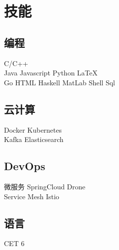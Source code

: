 \documentclass[]{deedy-resume-openfont}
\begin{document}
\begin{minipage}[t]{0.25\textwidth}

\section{技能}
\sectionsep
\subsection{编程}
C/C++ \\
Java \textbullet{} Javascript \textbullet{} Python \textbullet{} LaTeX\ \\
Go \textbullet{} HTML \textbullet{} Haskell \textbullet{} MatLab \textbullet{} Shell \textbullet{} Sql \\ 
\sectionsep

\subsection{云计算}
Docker \textbullet{} Kubernetes \\
Kafka \textbullet{} Elasticsearch \\
\sectionsep

\subsection{DevOps}
微服务 \textbullet{} SpringCloud \textbullet Drone \\
Service Mesh \textbullet{} Istio  \\
\sectionsep

\subsection{语言}
CET 6   \\
\sectionsep

%
%

\end{minipage} 
\hfill
\end{document}
